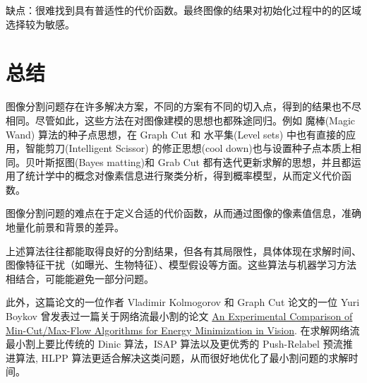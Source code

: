 \documentclass[lang=cn,11pt,a4paper]{elegantpaper}
\begin{document}
缺点：很难找到具有普适性的代价函数。最终图像的结果对初始化过程中的的区域选择较为敏感。

\section{总结}

图像分割问题存在许多解决方案，不同的方案有不同的切入点，得到的结果也不尽相同。尽管如此，这些方法在对图像建模的思想也都殊途同归。例如 魔棒(Magic Wand) 算法的种子点思想，在 Graph Cut 和 水平集(Level sets) 中也有直接的应用，智能剪刀(Intelligent Scissor) 的修正思想(cool down)也与设置种子点本质上相同。贝叶斯抠图(Bayes matting)和 Grab Cut 都有迭代更新求解的思想，并且都运用了统计学中的概念对像素信息进行聚类分析，得到概率模型，从而定义代价函数。

图像分割问题的难点在于定义合适的代价函数，从而通过图像的像素值信息，准确地量化前景和背景的差异。

上述算法往往都能取得良好的分割结果，但各有其局限性，具体体现在求解时间、图像特征干扰（如曝光、生物特征）、模型假设等方面。这些算法与机器学习方法相结合，可能能避免一部分问题。

此外，这篇论文的一位作者 Vladimir Kolmogorov 和 Graph Cut 论文的一位 Yuri Boykov 曾发表过一篇关于网络流最小割的论文 \href{https://ieeexplore.ieee.org/document/1316848}{An Experimental Comparison of Min-Cut/Max-Flow Algorithms for Energy Minimization in Vision}. 在求解网络流最小割上要比传统的 Dinic 算法，ISAP 算法以及更优秀的 Push-Relabel 预流推进算法, HLPP 算法更适合解决这类问题，从而很好地优化了最小割问题的求解时间。
\end{document}
